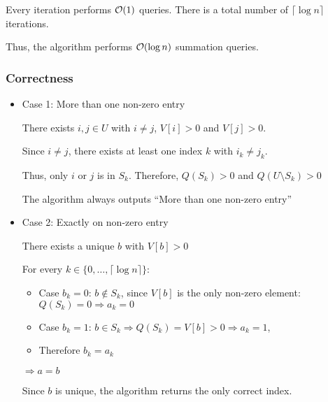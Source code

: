 Every iteration performs $\mathcal{O}(1)$ queries. There is a total number of $\lceil \log n \rceil$ iterations.

Thus, the algorithm performs $\mathcal{O}(\log n)$ summation queries.

\subsubsection*{Correctness}

\begin{itemize}
    \item Case 1: More than one non-zero entry
    
    There exists $i, j \in U$ with $i \neq j$, $V[i] > 0$ and $V[j] > 0$.
    
    Since $i \neq j$, there exists at least one index $k$ with $i_k \neq j_k$.
    
    Thus, only $i$ or $j$ is in $S_k$. Therefore, $Q(S_k) > 0$ and $Q(U \setminus S_k) > 0$
    
    The algorithm always outputs ``More than one non-zero entry''

    
    \item Case 2: Exactly on non-zero entry
    
    There exists a unique $b$ with $V[b] > 0$
    
    For every $k \in \{0,\dots, \lceil \log n \rceil\}$:
    
    \begin{itemize}
        \item Case $b_k = 0$: $b \notin S_k$, since $V[b]$ is the only non-zero element: $Q(S_k) = 0 \Rightarrow a_k = 0$
    
        \item Case $b_k = 1$: $b \in S_k \Rightarrow Q(S_k) = V[b] > 0 \Rightarrow a_k = 1$,
        
        \item Therefore $b_k = a_k$

    \end{itemize}
    
    $\Rightarrow a = b$
    
    Since $b$ is unique, the algorithm returns the only correct index.
    
\end{itemize}